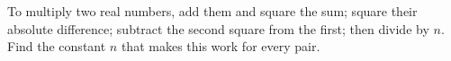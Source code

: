 To multiply two real numbers, add them and square the sum; square their absolute difference; subtract the second square from the first; then divide by $n$. Find the constant $n$ that makes this work for every pair.
